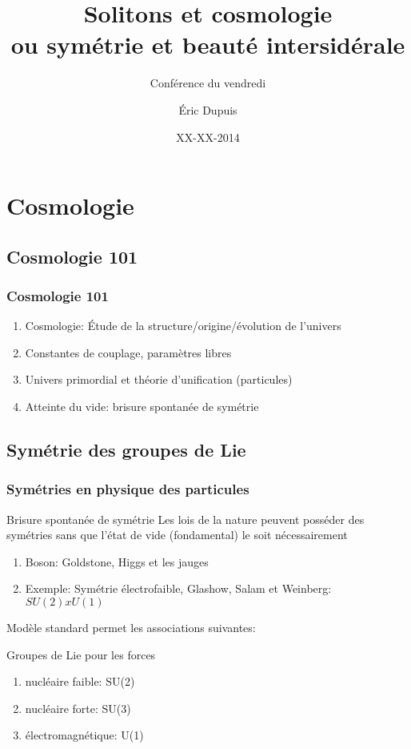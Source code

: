\documentclass[handout]{beamer}
\title{Solitons et cosmologie\\ ou symétrie et beauté intersidérale}
\subtitle{Conférence du vendredi}
\author{Éric Dupuis}
\institute{Université de Montréal, département de physique des particules}
\date{XX-XX-2014}
\begin{document}
\begin{frame}
\titlepage
\end{frame}
%

\section*{}
\begin{frame}
\tableofcontents
\end{frame}



\section{Cosmologie}
\subsection{Cosmologie 101}
\begin{frame}
\frametitle{Cosmologie 101}
\begin{enumerate}
\item Cosmologie: Étude de la structure/origine/évolution de l'univers
\item Constantes de couplage, paramètres libres
\item Univers primordial et théorie d'unification (particules)
\item Atteinte du vide: brisure spontanée de symétrie
\end{enumerate}
\end{frame}


\subsection{Symétrie des groupes de Lie}
\begin{frame}
\frametitle{Symétries en physique des particules}
\begin{block}{Brisure spontanée de symétrie}
Les lois de la nature peuvent posséder des symétries sans que l'état de vide (fondamental) le soit nécessairement
\begin{enumerate}
\item Boson: Goldstone, Higgs et les jauges
\item Exemple: Symétrie électrofaible, Glashow, Salam et Weinberg: $SU(2)xU(1)$ 
\end{enumerate}
\end{block}
Modèle standard permet les associations suivantes:
\begin{block}{Groupes de Lie pour les forces}
\begin{enumerate}
\item nucléaire faible: SU(2)
\item nucléaire forte: SU(3)
\item électromagnétique: U(1)
\end{enumerate}
\end{block}

\end{frame}
\end{document}
